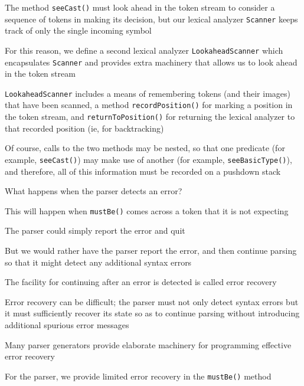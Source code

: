 \documentclass[8pt,a4paper,compress,handout]{beamer}
\begin{document}
\begin{frame}[fragile]
\pause

The method \lstinline{seeCast()} must look ahead in the token stream to consider a sequence of tokens in making its decision, but our lexical analyzer \lstinline{Scanner} keeps track of only the single incoming symbol

\pause
\bigskip

For this reason, we define a second lexical analyzer \lstinline{LookaheadScanner} which encapsulates \lstinline{Scanner} and provides extra machinery that allows us to look ahead in the token stream

\pause
\bigskip

\lstinline{LookaheadScanner} includes a means of remembering tokens (and their images) that have been scanned, a method \lstinline{recordPosition()} for marking a position in the token stream, and \lstinline{returnToPosition()} for returning the lexical analyzer to that recorded position (ie, for backtracking)

\pause
\bigskip

Of course, calls to the two methods may be nested, so that one predicate (for example, \lstinline{seeCast()}) may make use of another (for example, \lstinline{seeBasicType()}), and therefore, all of this information must be recorded on a pushdown stack
\end{frame}

\begin{frame}[fragile]
\pause

What happens when the parser detects an error?  

\pause
\bigskip

This will happen when \lstinline{mustBe()} comes across a token that it is not expecting

\pause
\bigskip

The parser could simply report the error and quit

\pause
\bigskip

But we would rather have the parser report the error, and then continue parsing so that it might detect any additional syntax errors

\pause
\bigskip

The facility for continuing after an error is detected is called error recovery

\pause
\bigskip

Error recovery can be difficult; the parser must not only detect syntax errors but it must sufficiently recover its state so as to continue parsing without introducing additional spurious error messages

\pause
\bigskip

Many parser generators provide elaborate machinery for programming effective error recovery

\pause
\bigskip

For the \jmm parser, we provide limited error recovery in the \lstinline{mustBe()} method
\end{frame}
\end{document}
